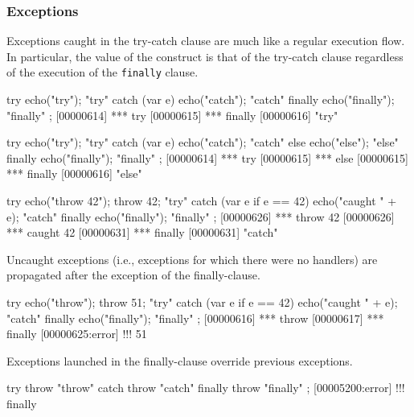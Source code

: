 \subsubsection{Exceptions}

Exceptions caught in the try-catch clause are much like a regular execution
flow.  In particular, the value of the construct is that of the try-catch
clause regardless of the execution of the \lstinline|finally| clause.

\begin{urbiscript}
try           { echo("try");     "try" }
catch (var e) { echo("catch");   "catch" }
finally       { echo("finally"); "finally" };
[00000614] *** try
[00000615] *** finally
[00000616] "try"

try           { echo("try");     "try" }
catch (var e) { echo("catch");   "catch" }
else          { echo("else");    "else" }
finally       { echo("finally"); "finally" };
[00000614] *** try
[00000615] *** else
[00000615] *** finally
[00000616] "else"

try                      { echo("throw 42"); throw 42; "try" }
catch (var e if e == 42) { echo("caught " + e);        "catch" }
finally                  { echo("finally");            "finally" };
[00000626] *** throw 42
[00000626] *** caught 42
[00000631] *** finally
[00000631] "catch"
\end{urbiscript}


Uncaught exceptions (i.e., exceptions for which there were no handlers) are
propagated after the exception of the finally-clause.

\begin{urbiscript}
try                      { echo("throw"); throw 51; "try" }
catch (var e if e == 42) { echo("caught " + e);     "catch" }
finally                  { echo("finally");         "finally" };
[00000616] *** throw
[00000617] *** finally
[00000625:error] !!! 51
\end{urbiscript}

Exceptions launched in the finally-clause override previous exceptions.

\begin{urbiscript}
try     { throw "throw" }
catch   { throw "catch" }
finally { throw "finally" };
[00005200:error] !!! finally
\end{urbiscript}



